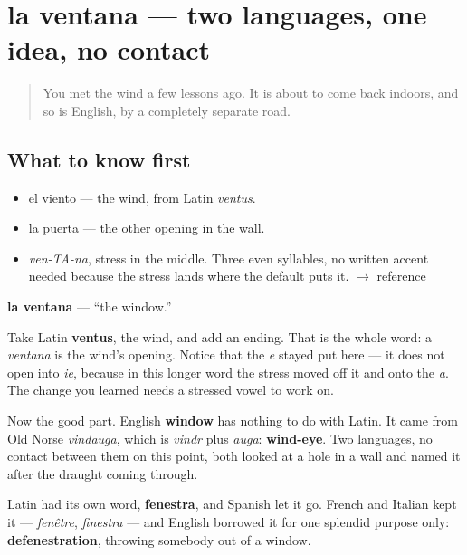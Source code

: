 \section[la ventana]{la ventana — two languages, one idea, no contact}

\label{lesson:ES-C279-ventana}



\begin{quote}
You met the wind a few lessons ago. It is about to come back indoors, and so is English, by a completely separate road.
\end{quote}

\subsection*{What to know first}
\begin{itemize}
\raggedright
  \item el viento — the wind, from Latin \emph{ventus}.
  \item la puerta — the other opening in the wall.
\end{itemize}

\begin{sounds}
\begin{itemize}
\raggedright
  \item \emph{ven-TA-na}, stress in the middle. Three even syllables, no written accent needed because the stress lands where the default puts it. $\to$ reference
\end{itemize}
\end{sounds}

\begin{cousinweb}
\textbf{la ventana} — \textquotedblleft{}the window.\textquotedblright{}

Take Latin \textbf{ventus}, the wind, and add an ending. That is the whole word: a \emph{ventana} is the wind's opening. Notice that the \emph{e} stayed put here — it does not open into \emph{ie}, because in this longer word the stress moved off it and onto the \emph{a}. The change you learned needs a stressed vowel to work on.

Now the good part. English \textbf{window} has nothing to do with Latin. It came from Old Norse \emph{vindauga}, which is \emph{vindr} plus \emph{auga}: \textbf{wind-eye}. Two languages, no contact between them on this point, both looked at a hole in a wall and named it after the draught coming through.

Latin had its own word, \textbf{fenestra}, and Spanish let it go. French and Italian kept it — \emph{fenêtre}, \emph{finestra} — and English borrowed it for one splendid purpose only: \textbf{defenestration}, throwing somebody out of a window.
\end{cousinweb}

